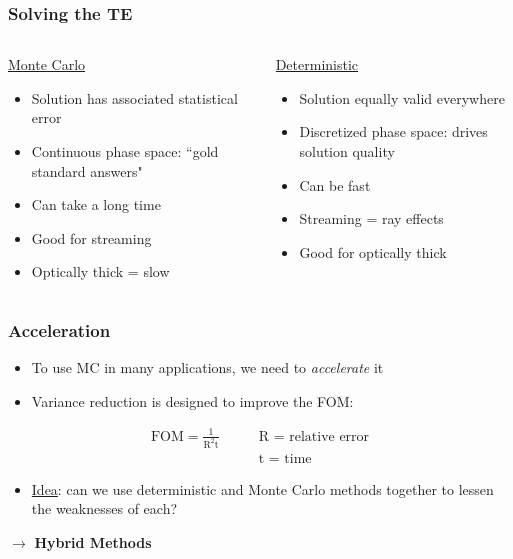 \documentclass[xcolor=x11names,compress]{beamer}
\renewcommand{\(}{\begin{columns}}
\renewcommand{\)}{\end{columns}}
\newcommand{\<}[1]{\begin{column}{#1}}
\renewcommand{\>}{\end{column}}
\begin{document}
\begin{frame}[fragile]
  \frametitle{Solving the TE}

\begin{columns}
  \begin{column}{0.5\textwidth}
  \begin{center}
  \underline{Monte Carlo}
  \end{center}
	\begin{itemize}
	\item Solution has associated statistical error
	\item Continuous phase space: ``gold standard answers"
	\item Can take a long time
	\item Good for streaming
	\item Optically thick = slow
	\end{itemize}
  \end{column}
  \begin{column}{0.5\textwidth}
  \begin{center}
  \underline{Deterministic}
  \end{center}
	\begin{itemize}
	\item Solution equally valid everywhere
	\item Discretized phase space: drives solution quality
	\item Can be fast
	\item Streaming = ray effects
	\item Good for optically thick
	\end{itemize}
  \end{column}
\end{columns}

\end{frame}

\begin{frame}[fragile]
  \frametitle{Acceleration}
  \begin{itemize}
  	\item To use MC in many applications, we need to \textit{accelerate} it
	\item Variance reduction is designed to improve the FOM:
  \end{itemize}
\begin{align}
\text{FOM} = \frac{1}{\text{R}^2\text{t}} \qquad & \text{R = relative error} \nonumber \\ 
& \text{t = time} \nonumber 
\end{align}
  \begin{itemize}
  	\item \underline{Idea}: can we use deterministic and Monte Carlo methods together to lessen the weaknesses of each?
  \end{itemize}
  $\rightarrow$ \textbf{Hybrid Methods}

\end{frame}
\end{document}
